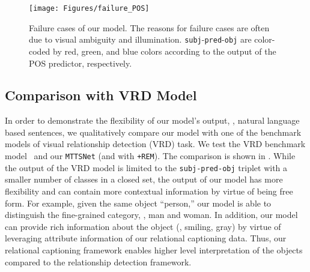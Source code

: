 \begin{figure}[b]
\vspace{-2mm}
\centering
	\texttt{[image: Figures/failure\_POS]}
   \vspace{-4mm}
   \caption{Failure cases of our model. The reasons for failure cases are often due to
   visual ambiguity and illumination.
   {\texttt{subj}-\texttt{pred}-\texttt{obj} are color-coded by red, green, and blue colors according to the output of the POS predictor, respectively.}}
\label{fig:failure}
\end{figure}





\subsection{Comparison with VRD Model}
In order to demonstrate the flexibility of our model's output,
\ie, natural language based sentences, we qualitatively compare our model with one of the benchmark models of visual relationship detection (VRD) task. 
We test the VRD benchmark model~\cite{lu2016visual} and our \texttt{MTTSNet} (and with \texttt{+REM}).
The comparison is shown in . 
While the output of the VRD model is limited to the \texttt{subj-pred-obj} triplet with a smaller number of classes in a closed set, the output of our model has
more flexibility and can contain more contextual information {by virtue of being free form}.
For example, given the same object ``person,'' our model is able to distinguish the fine-grained category, \ie, man and woman.
In addition, our model can provide rich information about the object (\eg, smiling, gray) by virtue of leveraging attribute information of our relational captioning data.
Thus, our relational captioning framework enables higher level interpretation of the objects compared to the relationship detection framework.










